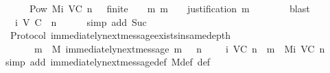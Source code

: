 \begin{isabellebody}
\ \ {\isachardoublequoteopen}{\isasymsigma}\ {\isasymin}\ {\isacharbraceleft}{\isasymsigma}\ {\isasymin}\ Pow\ {\isacharparenleft}M{\isacharunderscore}i\ {\isacharparenleft}V{\isacharcomma}C{\isacharcomma}{\isasymepsilon}{\isacharparenright}\ {\isacharparenleft}n\ {\isacharminus}\ {}{\isacharparenright}{\isacharparenright}{\isachardot}\ finite\ {\isasymsigma}\ {\isasymand}\ {\isacharparenleft}{\isasymforall}\ m{\isachardot}\ m\ {\isasymin}\ {\isasymsigma}\ {\isasymlongrightarrow}\ justification\ m\ {\isasymsubseteq}\ {\isasymsigma}{\isacharparenright}{\isacharbraceright}{\isachardoublequoteclose}\isanewline
\ \ \ \ \isamarkupfalse%
\ blast\isanewline
\ \ \isamarkupfalse%
\ \isamarkupfalse%
\ {\isachardoublequoteopen}{\isasymsigma}\ {\isasymin}\ {\isasymSigma}{\isacharunderscore}i\ {\isacharparenleft}V{\isacharcomma}\ C{\isacharcomma}\ {\isasymepsilon}{\isacharparenright}\ n{\isachardoublequoteclose}\isanewline
\ \ \ \ \isamarkupfalse%
\ {\isacharparenleft}simp\ add{\isacharcolon}\ Suc{\isacharparenright}\isanewline
\ \ \isamarkupfalse%
\isanewline
{}\isamarkupfalse%
%
\endisatagproof
{\isafoldproof}%
%
\isadelimproof
\isanewline
%
\endisadelimproof
\isanewline
{}\isamarkupfalse%
\ {\isacharparenleft}\ Protocol{\isacharparenright}\ immediately{\isacharunderscore}next{\isacharunderscore}message{\isacharunderscore}exists{\isacharunderscore}in{\isacharunderscore}same{\isacharunderscore}depth{\isacharcolon}\ \isanewline
\ \ {\isachardoublequoteopen}{\isasymforall}\ {\isasymsigma}\ {\isasymin}\ {\isasymSigma}{\isachardot}\ {\isasymforall}\ m\ {\isasymin}\ M{\isachardot}\ immediately{\isacharunderscore}next{\isacharunderscore}message\ {\isacharparenleft}{\isasymsigma}{\isacharcomma}m{\isacharparenright}\ {\isasymlongrightarrow}\ {\isacharparenleft}{\isasymexists}\ n\ {\isasymin}\ {\isasymnat}{\isachardot}\ {\isasymsigma}\ {\isasymin}\ {\isasymSigma}{\isacharunderscore}i\ {\isacharparenleft}V{\isacharcomma}C{\isacharcomma}{\isasymepsilon}{\isacharparenright}\ n\ {\isasymand}\ m\ {\isasymin}\ M{\isacharunderscore}i\ {\isacharparenleft}V{\isacharcomma}C{\isacharcomma}{\isasymepsilon}{\isacharparenright}\ n{\isacharparenright}{\isachardoublequoteclose}\isanewline
%
\isadelimproof
\ \ %
\endisadelimproof
%
\isatagproof
{}\isamarkupfalse%
\ {\isacharparenleft}simp\ add{\isacharcolon}\ immediately{\isacharunderscore}next{\isacharunderscore}message{\isacharunderscore}def\ M{\isacharunderscore}def\ {\isasymSigma}{\isacharunderscore}def{\isacharparenright}\isanewline

\end{isabellebody}

